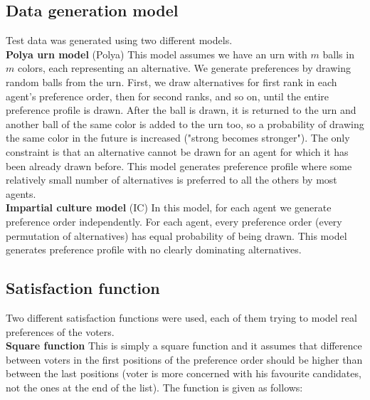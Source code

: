 \subsection{Data generation model}

Test data was generated using two different models.
\\

\noindent
\textbf{Polya urn model} (Polya) \hspace{.1in} This model assumes we have an urn with $m$ balls in $m$ colors, each representing an alternative. We generate preferences by drawing random balls from the urn. First, we draw alternatives for first rank in each agent's preference order, then for second ranks, and so on, until the entire preference profile is drawn. After the ball is drawn, it is returned to the urn and another ball of the same color is added to the urn too, so a probability of drawing the same color in the future is increased ("strong becomes stronger"). The only constraint is that an alternative cannot be drawn for an agent for which it has been already drawn before. This model generates preference profile where some relatively small number of alternatives is preferred to all the others by most agents.
\\

\noindent
\textbf{Impartial culture model} (IC) \hspace{.1in} In this model, for each agent we generate preference order independently. For each agent, every preference order (every permutation of alternatives) has equal probability of being drawn. This model generates preference profile with no clearly dominating alternatives.

\subsection{Satisfaction function}

Two different satisfaction functions were used, each of them trying to model real preferences of the voters.
\\

\noindent
\textbf{Square function} \hspace{.1in} This is simply a square function and it assumes that difference between voters in the first positions of the preference order should be higher than between the last positions (voter is more concerned with his favourite candidates, not the ones at the end of the list). The function is given as follows:


